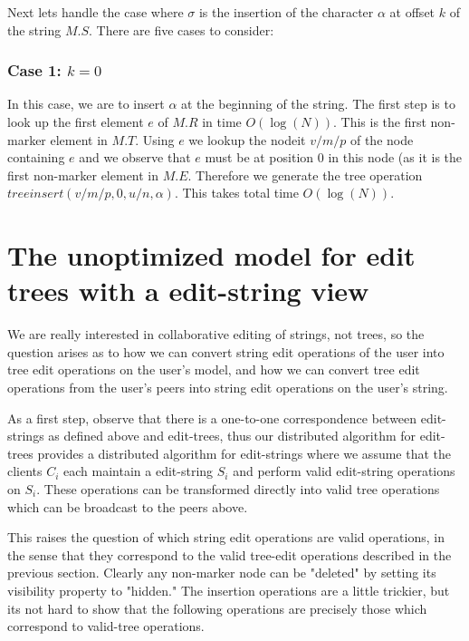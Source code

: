 \documentclass{amsart}
\begin{document}
Next lets handle the case where $\sigma$ is the insertion of the character $\alpha$
at offset $k$ of the string $M.S$.  There are five cases to consider:

\subsubsection{Case 1: $k=0$}
In this case, we are to insert $\alpha$ at the beginning of the string.
The first step is to look up the first element $e$ of $M.R$ in time $O(\log(N))$.
This is the first non-marker element in $M.T$. Using $e$ we lookup the
nodeit $v/m/p$ of the node containing $e$ and we observe that $e$ must be at position 0 in this node (as it is the first non-marker element in $M.E$. Therefore
we generate the tree operation $treeinsert(v/m/p,0,u/n,\alpha)$. This takes total time $O(\log(N))$.






\section{The unoptimized model for edit trees with a edit-string view}
We are really interested in collaborative editing of strings, not trees, so the
question arises as to how we can convert string edit operations of the user
into tree edit operations on the user's model, and how we can convert tree edit
operations from the user's peers into string edit operations on the user's string.

As a first step, observe that there is a one-to-one correspondence between
edit-strings as defined above and edit-trees, thus our distributed algorithm
for edit-trees provides a distributed algorithm for edit-strings where we
assume that the clients $C_i$ each maintain a edit-string $S_i$ and perform valid
edit-string operations on $S_i$. These operations can be transformed directly
into valid tree operations which can be broadcast to the peers above. 

This raises the question of which string edit operations are valid operations,
in the sense that they correspond to the valid tree-edit operations described
in the previous section.  Clearly any non-marker node can be "deleted" by setting
its visibility property to "hidden."  The insertion operations are a little
trickier, but its not hard to show that the following operations are precisely
those which correspond to valid-tree operations. 
\end{document}

